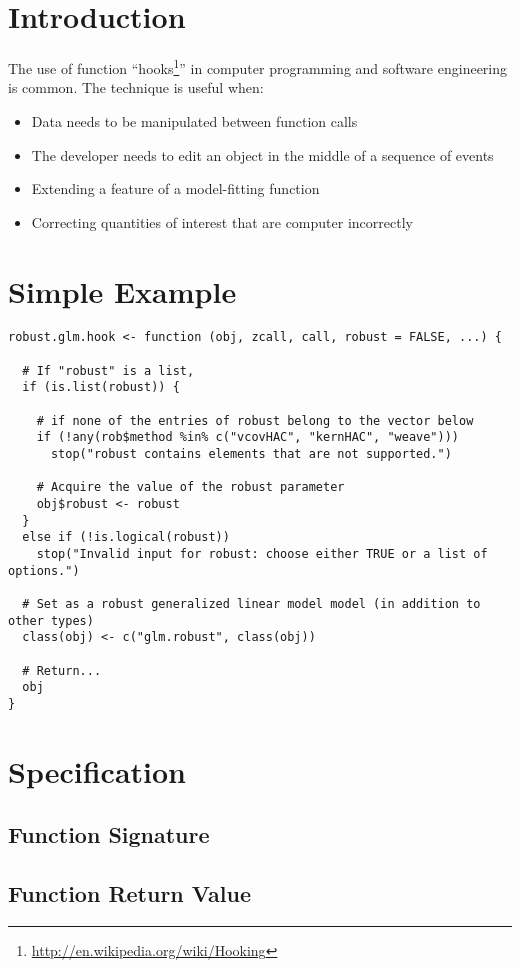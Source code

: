 \section{Introduction}

The use of function ``hooks\footnote{\url{http://en.wikipedia.org/wiki/Hooking}}''
in computer programming and software engineering is common. The technique is
useful when:

\begin{itemize}
  \item Data needs to be manipulated between function calls
  \item The developer needs to edit an object in the middle of a sequence of
    events
  \item Extending a feature of a model-fitting function
  \item Correcting quantities of interest that are computer incorrectly
\end{itemize}

\section{Simple Example}

\begin{verbatim}
robust.glm.hook <- function (obj, zcall, call, robust = FALSE, ...) {

  # If "robust" is a list, 
  if (is.list(robust)) {

    # if none of the entries of robust belong to the vector below
    if (!any(rob$method %in% c("vcovHAC", "kernHAC", "weave")))
      stop("robust contains elements that are not supported.")

    # Acquire the value of the robust parameter
    obj$robust <- robust
  }
  else if (!is.logical(robust))
    stop("Invalid input for robust: choose either TRUE or a list of options.")

  # Set as a robust generalized linear model model (in addition to other types)
  class(obj) <- c("glm.robust", class(obj))

  # Return...
  obj
}
\end{verbatim}

\section{Specification}



\subsection{Function Signature}

\subsection{Function Return Value}
